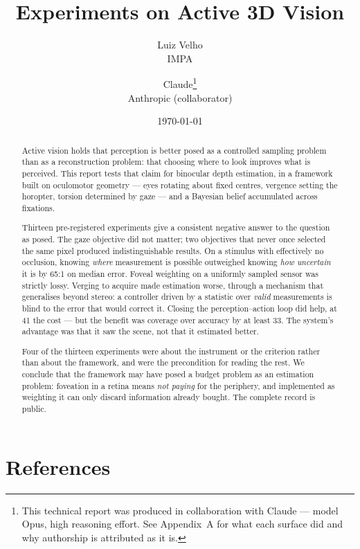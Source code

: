\documentclass[11pt]{article}
\title{Experiments on Active 3D Vision}
\author{
  Luiz Velho\\
  \normalsize IMPA
  \and
  Claude\thanks{This technical report was produced in collaboration with Claude
  --- model Opus, high reasoning effort. See Appendix~A for what each surface did
  and why authorship is attributed as it is.}\\
  \normalsize Anthropic (collaborator)
}
\date{\today}
\begin{document}
\maketitle

\begin{abstract}
Active vision holds that perception is better posed as a controlled sampling
problem than as a reconstruction problem: that choosing where to look improves
what is perceived. This report tests that claim for binocular depth estimation,
in a framework built on oculomotor geometry --- eyes rotating about fixed
centres, vergence setting the horopter, torsion determined by gaze --- and a
Bayesian belief accumulated across fixations.

Thirteen pre-registered experiments give a consistent negative answer to the
question as posed. The gaze objective did not matter; two objectives that never
once selected the same pixel produced indistinguishable results. On a stimulus
with effectively no occlusion, knowing \emph{where} measurement is possible
outweighed knowing \emph{how uncertain} it is by 65:1 on median error. Foveal
weighting on a uniformly sampled sensor was strictly lossy. Verging to acquire made estimation worse, through a mechanism
that generalises beyond stereo: a controller driven by a statistic over
\emph{valid} measurements is blind to the error that would correct it. Closing
the perception--action loop did help, at 41\texttimes{} the cost --- but the
benefit was coverage over accuracy by at least 33\texttimes{}. The system's
advantage was that it saw the scene, not that it estimated better.

Four of the thirteen experiments were about the instrument or the criterion
rather than about the framework, and were the precondition for reading the
rest. We conclude that the
framework may have posed a budget problem as an estimation problem: foveation in
a retina means \emph{not paying} for the periphery, and implemented as weighting
it can only discard information already bought. The complete record is public.
\end{abstract}







\section{References}
\printbibliography[heading=none]

\appendix

\end{document}
